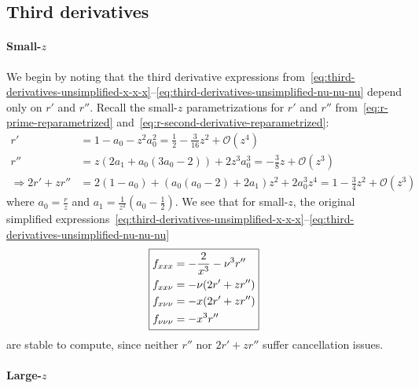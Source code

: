 \documentclass{article}
\begin{document}
\subsection{Third derivatives}

\paragraph{Small-$z$}

We begin by noting that the third derivative expressions from~\eqref{eq:third-derivatives-unsimplified-x-x-x}--\eqref{eq:third-derivatives-unsimplified-nu-nu-nu} depend only on $r'$ and $r''$.
Recall the small-$z$ parametrizations for $r'$ and $r''$ from~\eqref{eq:r-prime-reparametrized} and~\eqref{eq:r-second-derivative-reparametrized}:
%
\begin{align}
  r'                      & = 1 - a_0 - z^2 a_0^2 = \frac{1}{2} - \frac{3}{16}z^2 + \mathcal{O}(z^4)                          \\
  r''                     & = z (2a_1 + a_0 (3 a_0 - 2)) + 2 z^3 a_0^3 = -\frac{3}{8}z + \mathcal{O}(z^3)                     \\
  \Rightarrow 2r' + z r'' & = 2 (1 - a_0) + (a_0 (a_0 - 2) + 2 a_1) z^2 + 2 a_0^3 z^4 = 1 - \frac{3}{4}z^2 + \mathcal{O}(z^3)
\end{align}
%
where $a_0 = \frac{r}{z}$ and $a_1 = \frac{1}{z^2} (a_0 - \frac{1}{2})$.
We see that for small-$z$, the original simplified expressions~\eqref{eq:third-derivatives-unsimplified-x-x-x}--\eqref{eq:third-derivatives-unsimplified-nu-nu-nu}
%
\begin{align}
  \boxed{%
    \begin{aligned}
      f_{xxx}       & = -\frac{2}{x^3} - \nu^3 r'' \\
      f_{xx\nu}     & = -\nu(2r' + z r'')          \\
      f_{x\nu\nu}   & = -x(2r' + z r'')            \\
      f_{\nu\nu\nu} & = -x^3 r''
    \end{aligned}}
\end{align}
%
are stable to compute, since neither $r''$ nor $2r' + z r''$ suffer cancellation issues.

\paragraph{Large-$z$}
\end{document}
